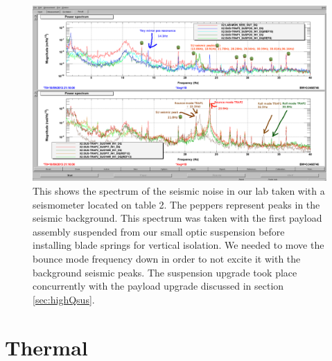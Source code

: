 \begin{figure}
  \centering
  \includegraphics[width=15cm]{./figures/modehunting.png}
  \caption[Seismic Noise Spectrum]{
    This shows the spectrum of the seismic noise in our lab taken with a
    seismometer located on table 2.
    The peppers represent peaks in the seismic background.
    This spectrum was taken with the first payload assembly
    suspended from our small optic suspension
    before installing blade springs for vertical isolation.
    We needed to move the bounce mode frequency down in order to not excite
    it with the background seismic peaks.
    The suspension upgrade took place concurrently with the payload upgrade
    discussed in section \ref{sec:highQsus}.
    }
  \label{fig:seismic}
\end{figure}



\section{Thermal}

